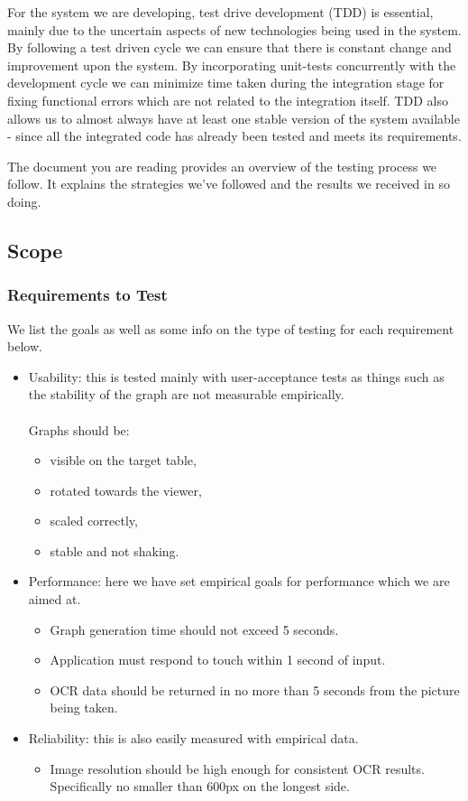 \documentclass[a4paper,12pt]{article}
\begin{document}
For the system we are developing, test drive development (TDD) is essential, mainly due to the uncertain aspects of new technologies being used in the system. By following a test driven cycle we can ensure that there is constant change and improvement upon the system. By incorporating unit-tests concurrently with the development cycle we can minimize time taken during the integration stage for fixing functional errors which are not related to the integration itself. TDD also allows us to almost always have at least one stable version of the system available - since all the integrated code has already been tested and meets its requirements.

The document you are reading provides an overview of the testing process we follow. It explains the strategies we've followed and the results we received in so doing.

\subsection{Scope}
\subsubsection{Requirements to Test}
We list the goals as well as some info on the type of testing for each requirement below.
\begin{itemize}
\item Usability: this is tested mainly with user-acceptance tests as things such as the stability of the graph are not measurable empirically. \\ \\
	Graphs should be:
	\begin{itemize}
		\item visible on the target table,
		\item rotated towards the viewer,
		\item scaled correctly,
		\item stable and not shaking.
	\end{itemize}
\item Performance: here we have set empirical goals for performance which we are aimed at.
	\begin{itemize}
		\item Graph generation time should not exceed 5 seconds.
		\item Application must respond to touch within 1 second of input.
		\item OCR data should be returned in no more than 5 seconds from the picture being taken.
	\end{itemize}
\item Reliability: this is also easily measured with empirical data.
	\begin{itemize}
		\item Image resolution should be high enough for consistent OCR results. Specifically no smaller than 600px on the longest side.
	\end{itemize}
\end{itemize}
\end{document}
